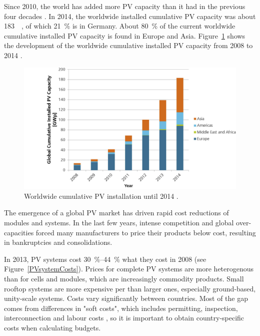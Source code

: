 Since 2010, the world has added more PV capacity than it had in the previous four decades \cite{IEA2014c}. In 2014, the worldwide installed cumulative PV capacity was about \SI{183}{\giga\wattp}, of which \SI{21}{\percent} is in Germany. About \SI{80}{\percent} of the current worldwide cumulative installed PV capacity is found in Europe and Asia. Figure~\ref{PV_Install_global} shows the development of the worldwide cumulative installed PV capacity from 2008 to 2014 \cite{FraunhoferISE2015}.


\begin{figure}[htbp]  
\centering
\includegraphics[width=0.7\linewidth]{FIG/PV_Install_global}
\caption[Worldwide cumulative PV installation until 2014.]{Worldwide cumulative PV installation until 2014 \cite{FraunhoferISE2015}.}\label{PV_Install_global}
\end{figure}
The emergence of a global PV market has driven rapid cost reductions of modules and systems. In the last few years, intense competition and global over-capacities forced many manufacturers to price their products below cost, resulting in bankruptcies and consolidations. 

In 2013, PV systems cost \SIrange{30}{44}{\percent} what they cost in 2008 (see Figure~\ref{PVsystemCosts}). Prices for complete PV systems are more heterogenous than for cells and modules, which are increasingly commodity products. Small rooftop systems are more expensive per \si{\wattp} than larger ones, especially ground-based, unity-scale systems. Costs vary significantly between countries. Most of the gap comes from differences in "soft costs", which includes permitting, inspection, interconnection and labour costs \cite{IEA2014c}, so it is important to obtain country-specific costs when calculating budgets.


